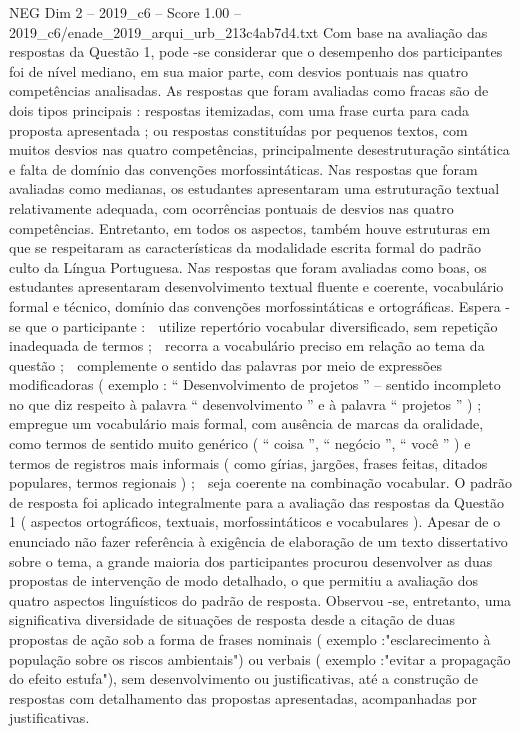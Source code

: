\begin{textsample}{NEG Dim 2 – 2019\_c6 – Score 1.00 – 2019\_c6/enade\_2019\_arqui\_urb\_213c4ab7d4.txt}
Com base na avaliação das respostas da Questão 1, pode -se considerar que o desempenho dos participantes foi de nível mediano, em sua maior parte, com desvios pontuais nas quatro competências analisadas.
As respostas que foram avaliadas como fracas são de dois tipos principais : respostas itemizadas, com uma frase curta para cada proposta apresentada ; ou respostas constituídas por pequenos textos, com muitos desvios nas quatro competências, principalmente desestruturação sintática e falta de domínio das convenções morfossintáticas.
Nas respostas que foram avaliadas como medianas, os estudantes apresentaram uma estruturação textual relativamente adequada, com ocorrências pontuais de desvios nas quatro competências.
Entretanto, em todos os aspectos, também houve estruturas em que se respeitaram as características da modalidade escrita formal do padrão culto da Língua Portuguesa.
Nas respostas que foram avaliadas como boas, os estudantes apresentaram desenvolvimento textual fluente e coerente, vocabulário formal e técnico, domínio das convenções morfossintáticas e ortográficas.
Espera -se que o participante :  utilize repertório vocabular diversificado, sem repetição inadequada de termos ;  recorra a vocabulário preciso em relação ao tema da questão ;  complemente o sentido das palavras por meio de expressões modificadoras ( exemplo : “ Desenvolvimento de projetos ” – sentido incompleto no que diz respeito à palavra “ desenvolvimento ” e à palavra “ projetos ” ) ;  empregue um vocabulário mais formal, com ausência de marcas da oralidade, como termos de sentido muito genérico ( “ coisa ”, “ negócio ”, “ você ” ) e termos de registros mais informais ( como gírias, jargões, frases feitas, ditados populares, termos regionais ) ;  seja coerente na combinação vocabular.
O padrão de resposta foi aplicado integralmente para a avaliação das respostas da Questão 1 ( aspectos ortográficos, textuais, morfossintáticos e vocabulares ).
Apesar de o enunciado não fazer referência à exigência de elaboração de um texto dissertativo sobre o tema, a grande maioria dos participantes procurou desenvolver as duas propostas de intervenção de modo detalhado, o que permitiu a avaliação dos quatro aspectos linguísticos do padrão de resposta.
Observou -se, entretanto, uma significativa diversidade de situações de resposta desde a citação de duas propostas de ação sob a forma de frases nominais ( exemplo :"esclarecimento à população sobre os riscos ambientais") ou verbais ( exemplo :"evitar a propagação do efeito estufa"), sem desenvolvimento ou justificativas, até a construção de respostas com detalhamento das propostas apresentadas, acompanhadas por justificativas.

\end{textsample}
